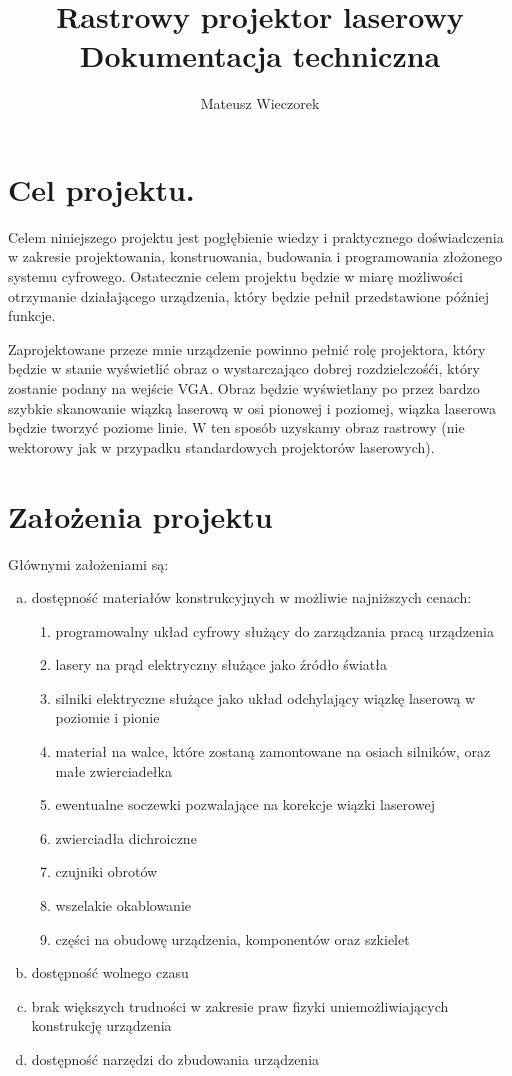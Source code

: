 \documentclass[a4paper,oneside,11pt]{report}
\author{Mateusz Wieczorek}
\title{Rastrowy projektor laserowy\\
Dokumentacja techniczna}
\begin{document}
\sloppy
\maketitle
\tableofcontents
\newpage
\section{Cel projektu.}
Celem niniejszego projektu jest pogłębienie wiedzy i praktycznego doświadczenia w zakresie projektowania, konstruowania, budowania i programowania złożonego systemu cyfrowego. Ostatecznie celem projektu będzie w miarę możliwości otrzymanie działającego urządzenia, który będzie pełnił przedstawione później funkcje.

Zaprojektowane przeze mnie urządzenie powinno pełnić rolę projektora, który będzie w stanie wyświetlić obraz o wystarczająco dobrej rozdzielczośći, który zostanie podany na wejście VGA. Obraz będzie wyświetlany po przez bardzo szybkie skanowanie wiązką laserową w osi pionowej i poziomej, wiązka laserowa będzie tworzyć poziome linie. W ten sposób uzyskamy obraz rastrowy (nie wektorowy jak w przypadku standardowych projektorów laserowych).
\section{Założenia projektu}
Głównymi założeniami są:
\begin{enumerate}[a)]
\item dostępność materiałów konstrukcyjnych w możliwie najniższych cenach:
\begin{enumerate}[-]
\item programowalny układ cyfrowy służący do zarządzania pracą urządzenia
\item lasery na prąd elektryczny służące jako źródło światła
\item silniki elektryczne służące jako układ odchylający wiązkę laserową w poziomie i pionie
\item materiał na walce, które zostaną zamontowane na osiach silników, oraz małe zwierciadełka
\item ewentualne soczewki pozwalające na korekcje wiązki laserowej
\item zwierciadła dichroiczne
\item czujniki obrotów
\item wszelakie okablowanie
\item części na obudowę urządzenia, komponentów oraz szkielet
\end{enumerate}
\item dostępność wolnego czasu
\item brak większych trudności w zakresie praw fizyki uniemożliwiających konstrukcję urządzenia
\item dostępność narzędzi do zbudowania urządzenia
\end{enumerate}
\end{document}
